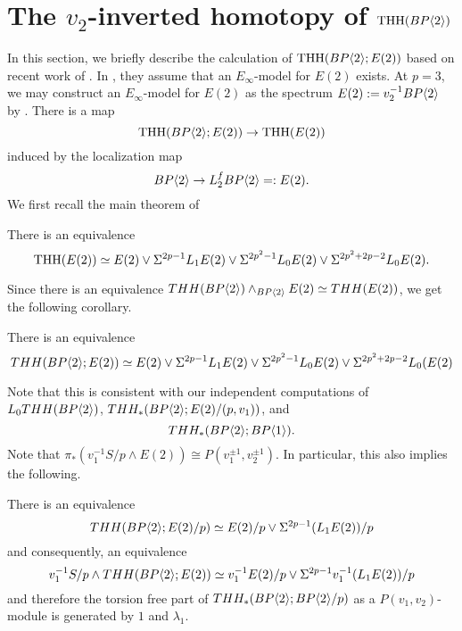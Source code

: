 
\section{The $v_2$-inverted homotopy of $\operatorname{THH}(BP\langle 2 \rangle)$}
In this section, we briefly describe the calculation of $\operatorname{THH}(BP\langle 2 \rangle;E(2))$ based on recent work of \cite{AusoniRichter}. In \cite{AusoniRichter}, they assume that an $E_{\infty}$-model for $E(2)$ exists. At $p=3$, we may construct an $E_{\infty}$-model for $E(2)$ as the spectrum $E(2):=v_2^{-1}BP\langle 2 \rangle$ by \cite{EKMM}. There is a map 
\[ \operatorname{THH}(BP\langle 2 \rangle;E(2))\to \operatorname{THH}(E(2)) \]
induced by the localization map 
\[BP\langle 2 \rangle\to L_2^fBP\langle 2 \rangle = : E(2).\]
We first recall the main theorem of \cite{AusoniRichter}
\begin{thm}
There is an equivalence 
\[ \operatorname{THH}(E(2)) \simeq E(2) \vee \Sigma^{2p-1}L_1E(2) \vee \Sigma ^{2p^2-1}L_0E(2) \vee \Sigma^{2p^2+2p-2} L_0E(2). \]
\end{thm}
Since there is an equivalence $THH(BP\langle 2 \rangle)\wedge_{BP\langle 2 \rangle}E(2)\simeq THH(E(2))$, we get the following corollary.
\begin{cor}
There is an equivalence
\[ THH(BP\langle 2 \rangle;E(2))\simeq E(2) \vee \Sigma^{2p-1}L_1E(2) \vee  \Sigma ^{2p^2-1}L_0E(2) \vee \Sigma^{2p^2+2p-2}L_0(E(2)\]
\end{cor}
Note that this is consistent with our independent computations of $L_0THH(BP\langle 2 \rangle)$, $THH_*(BP\langle 2 \rangle;E(2)/(p,v_1))$, and 
\[ THH_*(BP\langle 2 \rangle;BP\langle 1 \rangle).\]
Note that $\pi_*(v_1^{-1}S/p\wedge E(2))\cong P(v_1^{\pm 1},v_2^{\pm 1})$. In particular, this also implies the following. 
\begin{cor}
There is an equivalence
\[ THH(BP\langle 2 \rangle;E(2)/p)\simeq E(2)/p \vee \Sigma^{2p-1}(L_1E(2))/p\]
and consequently, an equivalence 
\[ v_1^{-1}S/p\wedge THH(BP\langle 2 \rangle;E(2))\simeq v_1^{-1}E(2)/p\vee \Sigma^{2p-1}v_1^{-1}(L_1E(2))/p\]
and therefore the torsion free part of 
$THH_*(BP\langle 2 \rangle;BP\langle 2 \rangle/p)$ as a $P(v_1,v_2)$-module is generated by $1$ and $\lambda_1$. 
\end{cor}

